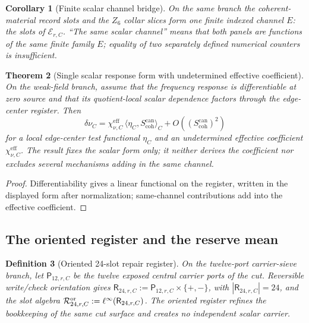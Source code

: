 \documentclass[11pt]{article}
\newtheorem{theorem}{Theorem}[section]
\newtheorem{corollary}[theorem]{Corollary}
\newtheorem{definition}[theorem]{Definition}
\theoremstyle{remark}
\theoremstyle{plain}
\begin{document}
\begin{corollary}[Finite scalar channel bridge]
\label{cor:finite-scalar-channel-bridge}
On the same branch the coherent-material record slots and the \(Z_6\)
collar slices form one finite indexed channel \(E\): the slots of
\(\mathcal E_{r,C}\). ``The same scalar channel'' means that both panels are
functions of the same finite family \(E\); equality of two separately
defined numerical counters is insufficient.
\end{corollary}

\begin{theorem}[Single scalar response form with undetermined effective coefficient]
\label{thm:unique-scalar-linear-response}
On the weak-field branch, assume that the frequency response is
differentiable at zero source and that its quotient-local scalar dependence
factors through the edge-center register. Then
\[
\delta\nu_C=\chi_{\nu,C}^{\mathrm{eff}}\,
\langle\eta_C,S_{\mathrm{coh}}^{\mathrm{can}}\rangle_C
+O\!\left((S_{\mathrm{coh}}^{\mathrm{can}})^2\right)
\]
for a local edge-center test functional \(\eta_C\) and an undetermined
effective coefficient \(\chi_{\nu,C}^{\mathrm{eff}}\). The result fixes the
scalar form only; it neither derives the coefficient nor excludes several
mechanisms adding in the same channel.
\end{theorem}

\begin{proof}
Differentiability gives a linear functional on the register, written in the
displayed form after normalization; same-channel contributions add into the
effective coefficient.
\end{proof}

\subsection{The oriented register and the reserve mean}

\begin{definition}[Oriented 24-slot repair register]
\label{def:oriented-24-slot-register}
On the twelve-port carrier-sieve branch, let \(\mathsf P_{12,r,C}\) be the
twelve exposed central carrier ports of the cut. Reversible write/check
orientation gives \(\mathsf R_{24,r,C}:=\mathsf P_{12,r,C}\times\{+,-\}\),
with \(|\mathsf R_{24,r,C}|=24\), and the slot algebra
\(\mathcal R^{\rm or}_{24,r,C}:=\ell^\infty(\mathsf R_{24,r,C})\). The
oriented register refines the bookkeeping of the same cut surface and creates
no independent scalar carrier.
\end{definition}
\end{document}
